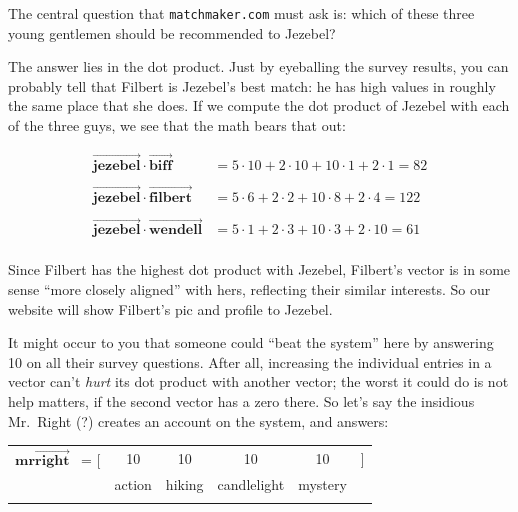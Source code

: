 The central question that \texttt{matchmaker.com} must ask is: which of these
three young gentlemen should be recommended to Jezebel?

\smallskip

The answer lies in the dot product. Just by eyeballing the survey results, you
can probably tell that Filbert is Jezebel's best match: he has high values in
roughly the same place that she does. If we compute the dot product of Jezebel
with each of the three guys, we see that the math bears that out:

\begin{align*}
\overrightarrow{\textbf{jezebel}} \cdot \overrightarrow{\textbf{biff}} &=
5 \cdot 10 + 2 \cdot 10 + 10 \cdot 1 + 2 \cdot 1 = 82 \\
\\
\overrightarrow{\textbf{jezebel}} \cdot \overrightarrow{\textbf{filbert}} &=
5 \cdot 6 + 2 \cdot 2 + 10 \cdot 8 + 2 \cdot 4 = 122 \\
\\
\overrightarrow{\textbf{jezebel}} \cdot \overrightarrow{\textbf{wendell}} &=
5 \cdot 1 + 2 \cdot 3 + 10 \cdot 3 + 2 \cdot 10 = 61 \\
\end{align*}

Since Filbert has the highest dot product with Jezebel, Filbert's vector is in
some sense ``more closely aligned'' with hers, reflecting their similar
interests. So our website will show Filbert's pic and profile to Jezebel.

\medskip


It might occur to you that someone could ``beat the system'' here by answering
10 on all their survey questions. After all, increasing the individual entries
in a vector can't \textit{hurt} its dot product with another vector; the worst
it could do is not help matters, if the second vector has a zero there. So
let's say the insidious Mr.~Right (?) creates an account on the system, and
answers:

\begin{center}
\begin{tabular}{cccccc}
$\overrightarrow{\textbf{mrright}}$ \quad \ = [ & 10 & 10 & 10 & 10 & ] \\
& \scriptsize{action} & \scriptsize{hiking} & \scriptsize{candlelight} &
\scriptsize{mystery} & \medskip \\
\normalsize
\end{tabular}
\end{center}
\vspace{-.15in}

